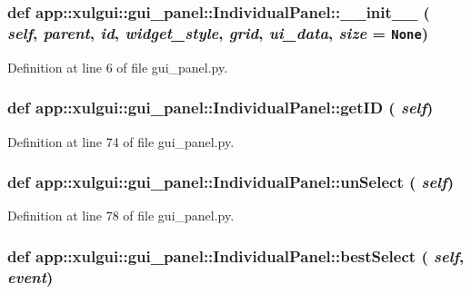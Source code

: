 \subsubsection{\setlength{\rightskip}{0pt plus 5cm}def app::xulgui::gui\_\-panel::IndividualPanel::\_\-\_\-init\_\-\_\- ( {\em self},  {\em parent},  {\em id},  {\em widget\_\-style},  {\em grid},  {\em ui\_\-data},  {\em size} = {\tt None})}\label{classapp_1_1xulgui_1_1gui__panel_1_1IndividualPanel_e1f1ef2f8067adda975743489bfe7c1c}




Definition at line 6 of file gui\_\-panel.py.
\subsubsection{\setlength{\rightskip}{0pt plus 5cm}def app::xulgui::gui\_\-panel::IndividualPanel::getID ( {\em self})}\label{classapp_1_1xulgui_1_1gui__panel_1_1IndividualPanel_de0cf5c63ea065bf4cc2c333271796b8}




Definition at line 74 of file gui\_\-panel.py.
\subsubsection{\setlength{\rightskip}{0pt plus 5cm}def app::xulgui::gui\_\-panel::IndividualPanel::unSelect ( {\em self})}\label{classapp_1_1xulgui_1_1gui__panel_1_1IndividualPanel_e50ed28de53dee79ba8504de2edce094}




Definition at line 78 of file gui\_\-panel.py.
\subsubsection{\setlength{\rightskip}{0pt plus 5cm}def app::xulgui::gui\_\-panel::IndividualPanel::bestSelect ( {\em self},  {\em event})}\label{classapp_1_1xulgui_1_1gui__panel_1_1IndividualPanel_a9a356247486ec43d78e375c7d355939}




